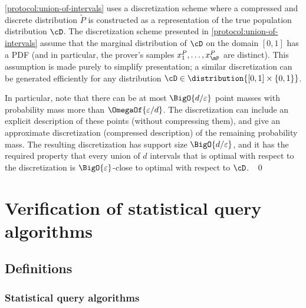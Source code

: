\begin{remark}
	\cref{protocol:union-of-intervals} uses a discretization scheme where a compressed and discrete distribution $\tilde{P}$ is constructed as a  representation of the true population distribution $\cD$. The discretization scheme presented in \cref{protocol:union-of-intervals} assume that the marginal distribution of $\cD$ on the domain $[0,1]$ has a PDF (and in particular, the prover's samples $x_1^P,\dots,x_{\mP}^P$ are distinct). This assumption is made purely to simplify presentation; a similar discretization can be generated efficiently for any distribution $\cD \in \distribution{[0,1]\times \{0,1\}}$. 
	
	In particular, note that there can be at most $\BigO{d/\varepsilon}$ point masses with probability mass more than $\OmegaOf{\varepsilon/d}$. The discretization can include an explicit description of these points (without compressing them), and give an approximate discretization (compressed description) of the remaining probability mass. The resulting discretization has support size $\BigO{d/\varepsilon}$, and it has the required property that every union of $d$ intervals that is optimal with respect to the discretization is $\BigO{\varepsilon}$-close to optimal with respect to $\cD$.
	~\qed 
\end{remark}

\section{Verification of statistical query algorithms}\label{section:sq-algorithm-verification}

\subsection{Definitions}

\subsubsection{Statistical query algorithms}


